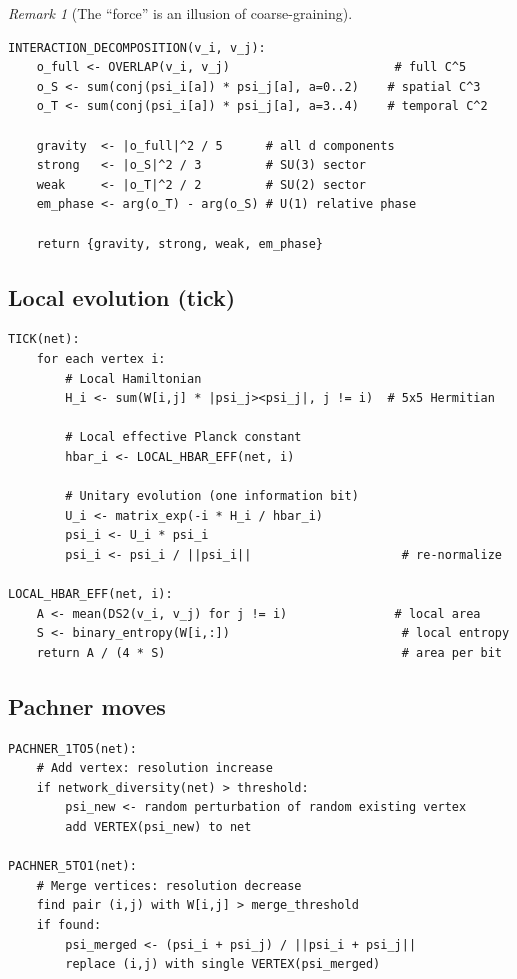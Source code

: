 \documentclass[12pt]{article}
\theoremstyle{remark}
\newtheorem{remark}[theorem]{Remark}
\theoremstyle{definition}
\begin{document}
\begin{remark}[The ``force'' is an illusion of coarse-graining]
\begin{verbatim}
INTERACTION_DECOMPOSITION(v_i, v_j):
    o_full <- OVERLAP(v_i, v_j)                       # full C^5
    o_S <- sum(conj(psi_i[a]) * psi_j[a], a=0..2)    # spatial C^3
    o_T <- sum(conj(psi_i[a]) * psi_j[a], a=3..4)    # temporal C^2

    gravity  <- |o_full|^2 / 5      # all d components
    strong   <- |o_S|^2 / 3         # SU(3) sector
    weak     <- |o_T|^2 / 2         # SU(2) sector
    em_phase <- arg(o_T) - arg(o_S) # U(1) relative phase

    return {gravity, strong, weak, em_phase}
\end{verbatim}

\subsection{Local evolution (tick)}

\begin{verbatim}
TICK(net):
    for each vertex i:
        # Local Hamiltonian
        H_i <- sum(W[i,j] * |psi_j><psi_j|, j != i)  # 5x5 Hermitian

        # Local effective Planck constant
        hbar_i <- LOCAL_HBAR_EFF(net, i)

        # Unitary evolution (one information bit)
        U_i <- matrix_exp(-i * H_i / hbar_i)
        psi_i <- U_i * psi_i
        psi_i <- psi_i / ||psi_i||                     # re-normalize

LOCAL_HBAR_EFF(net, i):
    A <- mean(DS2(v_i, v_j) for j != i)               # local area
    S <- binary_entropy(W[i,:])                        # local entropy
    return A / (4 * S)                                 # area per bit
\end{verbatim}

\subsection{Pachner moves}

\begin{verbatim}
PACHNER_1TO5(net):
    # Add vertex: resolution increase
    if network_diversity(net) > threshold:
        psi_new <- random perturbation of random existing vertex
        add VERTEX(psi_new) to net

PACHNER_5TO1(net):
    # Merge vertices: resolution decrease
    find pair (i,j) with W[i,j] > merge_threshold
    if found:
        psi_merged <- (psi_i + psi_j) / ||psi_i + psi_j||
        replace (i,j) with single VERTEX(psi_merged)
\end{verbatim}


\end{remark}
\end{document}
